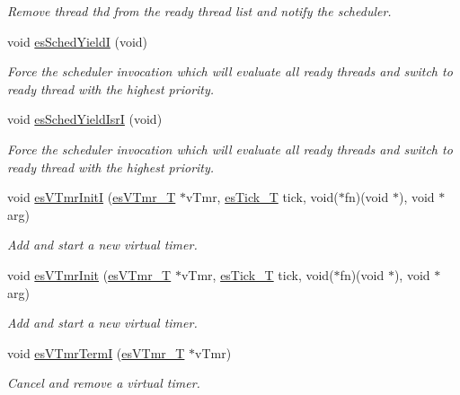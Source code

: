 \begin{DoxyCompactItemize}
\begin{DoxyCompactList}\small\item\em Remove thread {\ttfamily thd} from the ready thread list and notify the scheduler. \end{DoxyCompactList}\item 
void \hyperlink{group__kern__impl_gaf90e487bfce974dafaeed5009e189810}{es\-Sched\-Yield\-I} (void)
\begin{DoxyCompactList}\small\item\em Force the scheduler invocation which will evaluate all ready threads and switch to ready thread with the highest priority. \end{DoxyCompactList}\item 
void \hyperlink{group__kern__impl_gafbea29b376b29f11bbfc48a0f5144e9a}{es\-Sched\-Yield\-Isr\-I} (void)
\begin{DoxyCompactList}\small\item\em Force the scheduler invocation which will evaluate all ready threads and switch to ready thread with the highest priority. \end{DoxyCompactList}\item 
void \hyperlink{group__kern__impl_ga45fe650eac73e7fe203cc81565401555}{es\-V\-Tmr\-Init\-I} (\hyperlink{group__kern__vtmr_ga3c020f0ca54ff412bc1d1505502d2afc}{es\-V\-Tmr\-\_\-\-T} $\ast$v\-Tmr, \hyperlink{group__kern__vtmr_ga844873888c186ee81eb66620dadb0451}{es\-Tick\-\_\-\-T} tick, void($\ast$fn)(void $\ast$), void $\ast$arg)
\begin{DoxyCompactList}\small\item\em Add and start a new virtual timer. \end{DoxyCompactList}\item 
void \hyperlink{group__kern__impl_gad932cf00aec4ba03a0df02ccc493c4c2}{es\-V\-Tmr\-Init} (\hyperlink{group__kern__vtmr_ga3c020f0ca54ff412bc1d1505502d2afc}{es\-V\-Tmr\-\_\-\-T} $\ast$v\-Tmr, \hyperlink{group__kern__vtmr_ga844873888c186ee81eb66620dadb0451}{es\-Tick\-\_\-\-T} tick, void($\ast$fn)(void $\ast$), void $\ast$arg)
\begin{DoxyCompactList}\small\item\em Add and start a new virtual timer. \end{DoxyCompactList}\item 
void \hyperlink{group__kern__impl_ga96bb2c81f649c0305dfd08d1c79b2e37}{es\-V\-Tmr\-Term\-I} (\hyperlink{group__kern__vtmr_ga3c020f0ca54ff412bc1d1505502d2afc}{es\-V\-Tmr\-\_\-\-T} $\ast$v\-Tmr)
\begin{DoxyCompactList}\small\item\em Cancel and remove a virtual timer. \end{DoxyCompactList}\item 

\end{DoxyCompactItemize}
